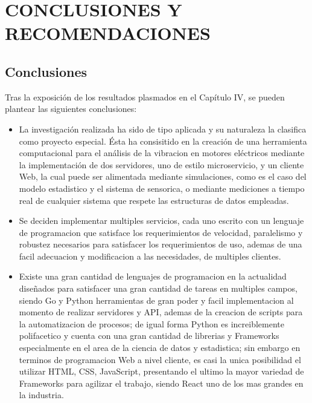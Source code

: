 \thispagestyle{empty}

\section{CONCLUSIONES Y RECOMENDACIONES}
\subsection{Conclusiones}
Tras la exposición de los resultados plasmados en el Capítulo IV, se pueden
plantear las siguientes conclusiones:

\begin{itemize}
    \item La investigación realizada ha sido de tipo aplicada y su naturaleza
        la clasifica como proyecto especial. Ésta ha consisitido en la creación
        de una herramienta computacional para el análisis de la vibracion en motores
        eléctricos mediante la implementación de dos servidores, uno de estilo
        microservicio, y un cliente Web, la cual puede ser alimentada mediante
        simulaciones, como es el caso del modelo estadistico y el sistema de
        sensorica, o mediante mediciones a tiempo real de cualquier sistema
        que respete las estructuras de datos empleadas.
    \item Se deciden implementar multiples servicios, cada uno escrito con un
        lenguaje de programacion que satisface los requerimientos de velocidad,
        paralelismo y robustez necesarios para satisfacer los requerimientos de
        uso, ademas de una facil adecuacion y modificacion a las necesidades,
        de multiples clientes.
    \item Existe una gran cantidad de lenguajes de programacion en la actualidad
        diseñados para satisfacer una gran cantidad de tareas en multiples campos,
        siendo Go y Python herramientas de gran poder y facil implementacion
        al momento de realizar servidores y API, ademas de la creacion de scripts
        para la automatizacion de procesos; de igual forma Python es increiblemente
        polifacetico y cuenta con una gran cantidad de librerias y Frameworks
        especialmente en el area de la ciencia de datos y estadistica; sin embargo
        en terminos de programacion Web a nivel cliente, es casi la unica
        posibilidad el utilizar HTML, CSS, JavaScript, presentando el ultimo la
        mayor variedad de Frameworks para agilizar el trabajo, siendo React uno
        de los mas grandes en la industria.

\end{itemize}
